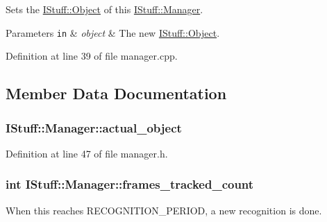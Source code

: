 Sets the \hyperlink{class_i_stuff_1_1_object}{I\-Stuff\-::\-Object} of this \hyperlink{class_i_stuff_1_1_manager}{I\-Stuff\-::\-Manager}. 


\begin{DoxyParams}[1]{Parameters}
\mbox{\tt in}  & {\em object} & The new \hyperlink{class_i_stuff_1_1_object}{I\-Stuff\-::\-Object}. \\
\hline
\end{DoxyParams}


Definition at line 39 of file manager.\-cpp.



\subsection{Member Data Documentation}
\hypertarget{class_i_stuff_1_1_manager_a9b898107c919a3ba73f60278c9c05742}{
\subsubsection[{actual\-\_\-object}]{ I\-Stuff\-::\-Manager\-::actual\-\_\-object\hspace{0.3cm}{\ttfamily [private]}}}\label{class_i_stuff_1_1_manager_a9b898107c919a3ba73f60278c9c05742}


Definition at line 47 of file manager.\-h.

\hypertarget{class_i_stuff_1_1_manager_a3cacb02ece1a4938e7754ad553c91a74}{
\subsubsection[{frames\-\_\-tracked\-\_\-count}]{\setlength{\rightskip}{0pt plus 5cm}int I\-Stuff\-::\-Manager\-::frames\-\_\-tracked\-\_\-count\hspace{0.3cm}{\ttfamily [private]}}}\label{class_i_stuff_1_1_manager_a3cacb02ece1a4938e7754ad553c91a74}


When this reaches R\-E\-C\-O\-G\-N\-I\-T\-I\-O\-N\-\_\-\-P\-E\-R\-I\-O\-D, a new recognition is done. 



